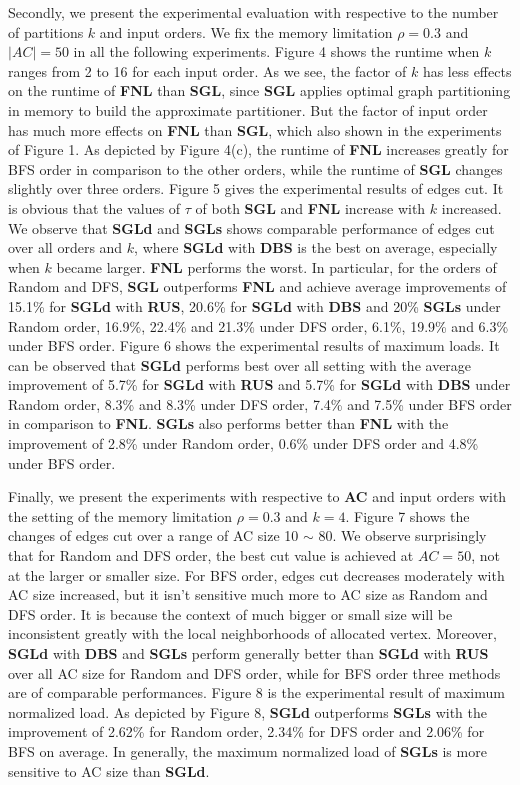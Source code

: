 \documentclass{sig-alternate-2013}
\begin{document}
Secondly, we present the experimental evaluation with respective to the number of partitions $k$ and input orders. We fix the memory limitation $\rho = 0.3$ and $|AC| = 50$ in all the following experiments.
Figure 4 shows the runtime when $k$ ranges from 2 to 16 for each input order. As we see, the factor of $k$ has less effects on the runtime of \textbf{FNL} than \textbf{SGL}, since \textbf{SGL} applies optimal graph partitioning in memory to build the approximate partitioner. But the factor of input order has much more effects on \textbf{FNL} than \textbf{SGL}, which also shown in the experiments of Figure 1. As depicted by Figure 4(c), the runtime of \textbf{FNL} increases greatly for BFS order in comparison to the other orders, while the runtime of \textbf{SGL} changes slightly over three orders.
Figure 5 gives the experimental results of edges cut. It is obvious that the values of $\tau$ of both \textbf{SGL} and \textbf{FNL} increase with $k$ increased. We observe that \textbf{SGLd} and \textbf{SGLs} shows comparable performance of edges cut over all orders and $k$, where \textbf{SGLd} with \textbf{DBS} is the best on average, especially when $k$ became larger. \textbf{FNL} performs the worst. In particular, for the orders of Random and DFS, \textbf{SGL} outperforms \textbf{FNL} and achieve average improvements of 15.1\% for \textbf{SGLd} with \textbf{RUS}, 20.6\% for \textbf{SGLd} with \textbf{DBS} and 20\% \textbf{SGLs} under Random order, 16.9\%, 22.4\% and 21.3\% under DFS order, 6.1\%, 19.9\% and 6.3\% under BFS order.
Figure 6 shows the experimental results of maximum loads. It can be observed that \textbf{SGLd} performs best over all setting with the average improvement of
5.7\% for \textbf{SGLd} with \textbf{RUS} and 5.7\% for \textbf{SGLd} with \textbf{DBS} under Random order, 8.3\% and 8.3\% under DFS order, 7.4\% and 7.5\% under BFS order in comparison to \textbf{FNL}. \textbf{SGLs} also performs better than \textbf{FNL} with the improvement of 2.8\% under Random order, 0.6\% under DFS order and 4.8\% under BFS order.

Finally, we present the experiments with respective to \textbf{AC} and input orders with the setting of the memory limitation $\rho = 0.3$ and $k=4$. Figure 7 shows the changes of edges cut over a range of AC size 10 $\sim$ 80. We observe surprisingly that for Random and DFS order, the best cut value is achieved at $AC=50$, not at the larger or smaller size. For BFS order, edges cut decreases moderately with AC size increased, but it isn't sensitive much more to AC size as Random and DFS order. It is because the context of much bigger or small size will be inconsistent greatly with the local neighborhoods of allocated vertex. Moreover, \textbf{SGLd} with \textbf{DBS} and \textbf{SGLs} perform generally better than \textbf{SGLd} with \textbf{RUS} over all AC size for Random and DFS order, while for BFS order three methods are of comparable performances. Figure 8 is the experimental result of maximum normalized load. As depicted by Figure 8, \textbf{SGLd} outperforms \textbf{SGLs} with the improvement of 2.62\% for Random order, 2.34\% for DFS order and 2.06\% for BFS on average. In generally, the maximum normalized load of \textbf{SGLs} is more sensitive to AC size than \textbf{SGLd}.
\end{document}
